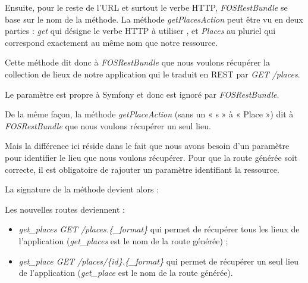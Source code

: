 \documentclass[big]{zmdocument}
\begin{document}
Ensuite, pour le reste de l'URL et surtout le verbe HTTP, \textit{FOSRestBundle} se base sur le nom de la méthode. La méthode \textit{getPlacesAction} peut être vu en deux parties : \textit{get} qui désigne le verbe HTTP à utiliser , et \textit{Places} au pluriel qui correspond exactement au même nom que notre ressource.



Cette méthode dit donc à \textit{FOSRestBundle} que nous voulons récupérer la collection de lieux de notre application qui le traduit en REST par \textit{GET /places}.



\begin{Information}
Le paramètre  est propre à Symfony et donc est ignoré par \textit{FOSRestBundle}.
\end{Information}


De la même façon, la méthode \textit{getPlaceAction} (sans un ­­­« s » à « Place ») dit à \textit{FOSRestBundle} que nous voulons récupérer un seul lieu.



Mais la différence ici réside dans le fait que nous avons besoin d'un paramètre pour identifier le lieu que nous voulons récupérer. Pour que la route générée soit correcte, il est obligatoire de rajouter un paramètre identifiant la ressource.



La signature de la méthode devient alors :






Les nouvelles routes deviennent :



\begin{itemize}
\item \textit{get\_places GET /places.\{\_format\}} qui permet de récupérer tous les lieux de l'application (\textit{get\_places} est le nom de la route générée) ;
\item \textit{get\_place GET /places/\{id\}.\{\_format\}} qui permet de récupérer un seul lieu de l'application (\textit{get\_place} est le nom de la route générée).
\end{itemize}
\end{document}
